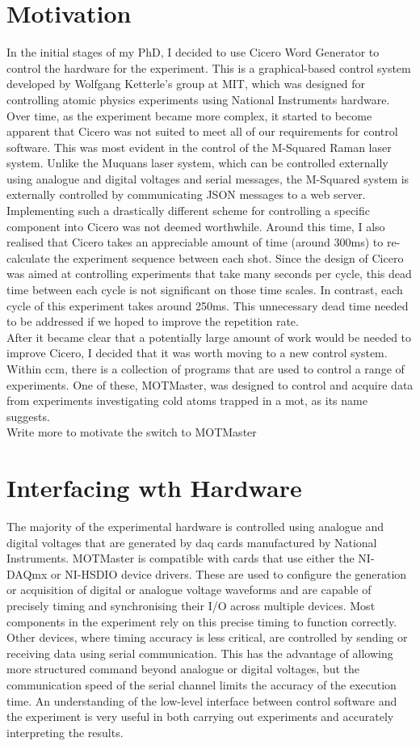 \section{Motivation}
In the initial stages of my PhD, I decided to use Cicero Word Generator \cite{Keshet2012} to control the hardware for the experiment. This is a graphical-based control system developed by Wolfgang Ketterle's group at MIT, which was designed for controlling atomic physics experiments using National Instruments hardware. Over time, as the experiment became more complex, it started to become apparent that Cicero was not suited to meet all of our requirements for control software. This was most evident in the control of the M-Squared Raman laser system. Unlike the Muquans laser system, which can be controlled externally using analogue and digital voltages and serial messages, the M-Squared system is externally controlled by communicating JSON messages to a web server. Implementing such a drastically different scheme for controlling a specific component into Cicero was not deemed worthwhile. Around this time, I also realised that Cicero takes an appreciable amount of time (around 300ms) to re-calculate the experiment sequence between each shot. Since the design of Cicero was aimed at controlling experiments that take many seconds per cycle, this dead time between each cycle is not significant on those time scales. In contrast, each cycle of this experiment takes around 250ms. This unnecessary dead time needed to be addressed if we hoped to improve the repetition rate. \\
After it became clear that a potentially large amount of work would be needed to improve Cicero, I decided that it was worth moving to a new control system. Within \ac{ccm}, there is a collection of programs that are used to control a range of experiments. One of these, MOTMaster, was designed to control and acquire data from experiments investigating cold atoms trapped in a \ac{mot}, as its name suggests.\\
{\Huge Write more to motivate the switch to MOTMaster}

\section{Interfacing wth Hardware}
The majority of the experimental hardware is controlled using analogue and digital voltages that are generated by \ac{daq} cards manufactured by National Instruments. MOTMaster is compatible with cards that use either the NI-DAQmx or NI-HSDIO device drivers. These are used to configure the generation or acquisition of digital or analogue voltage waveforms and are capable of precisely timing and synchronising their I/O across multiple devices. Most components in the experiment rely on this precise timing to function correctly. Other devices, where timing accuracy is less critical, are controlled by sending or receiving data using serial communication. This has the advantage of allowing more structured command beyond analogue or digital voltages, but the communication speed of the serial channel limits the accuracy of the execution time. An understanding of the low-level interface between control software and the experiment is very useful in both carrying out experiments and accurately interpreting the results.
